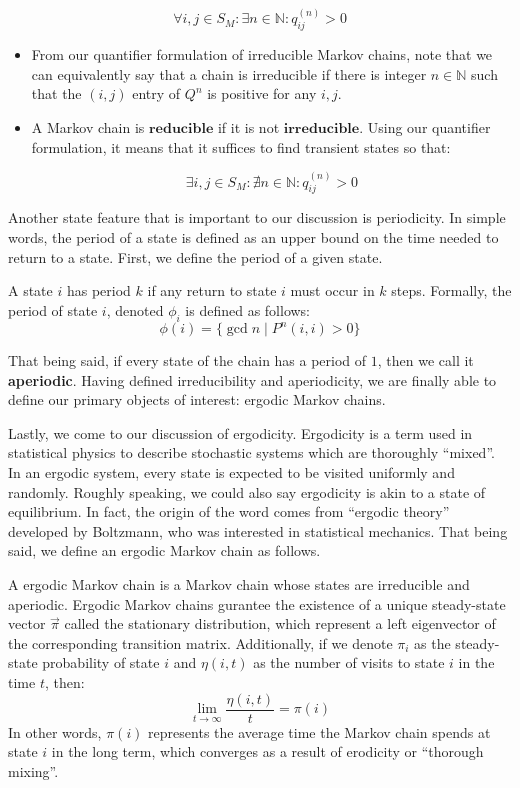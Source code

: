 $$\forall i,j \in S_M: \exists n \in \mathbb{N} : q_{ij}^{(n)} > 0$$
\begin{itemize}
\item From our quantifier formulation of irreducible Markov chains, note that we can equivalently say that a chain is irreducible if there is integer $n \in \mathbb{N}$ such that the $(i,j)$ entry of $Q^n$ is positive for any $i,j$.

\item A Markov chain is $\textbf{reducible}$ if it is not $\textbf{irreducible}$. Using our quantifier formulation, it means that it suffices to find transient states so that:

$$\exists i,j \in S_M: \nexists n \in \mathbb{N} : q_{ij}^{(n)} > 0$$
\end{itemize}

Another state feature that is important to our discussion is periodicity.
In simple words, the period of a state is defined as an upper bound on the time needed to return to a state.
First, we define the period of a given state.

\begin{definition}[Period]
A state $i$ has period $k$ if any return to state $i$ must occur in $k$ steps.
Formally, the period of state $i$, denoted $\phi_i$ is defined as follows:
$$\phi(i) = \{\gcd{n} \mid P^n(i,i) > 0\}$$
\end{definition}

That being said, if every state of the chain has a period of $1$, then we call it \textbf{aperiodic}.
Having defined irreducibility and aperiodicity, we are finally able to define our primary objects of interest: ergodic Markov chains.

\newpage
{}

Lastly, we come to our discussion of ergodicity. Ergodicity is a term used in statistical physics to describe stochastic systems which are thoroughly ``mixed''.
In an ergodic system, every state is expected to be visited uniformly and randomly. Roughly speaking, we could also say ergodicity is akin to a state of equilibrium.
In fact, the origin of the word comes from ``ergodic theory'' developed by Boltzmann, who was interested in statistical mechanics.
That being said, we define an ergodic Markov chain as follows.

\begin{definition}
A ergodic Markov chain is a Markov chain whose states are irreducible and aperiodic.
Ergodic Markov chains gurantee the existence of a unique steady-state vector $\vec{\pi}$ called the stationary distribution, which represent a left eigenvector of the corresponding transition matrix.
Additionally, if we denote $\pi_i$ as the steady-state probability of state $i$ and $\eta(i,t)$ as the number of visits to state $i$ in the time $t$, then:
$$\lim_{t \to \infty} \frac{\eta(i,t)}{t} = \pi(i)$$
In other words, $\pi(i)$ represents the average time the Markov chain spends at state $i$ in the long term, which converges as a result of erodicity or ``thorough mixing''.

\end{definition}

